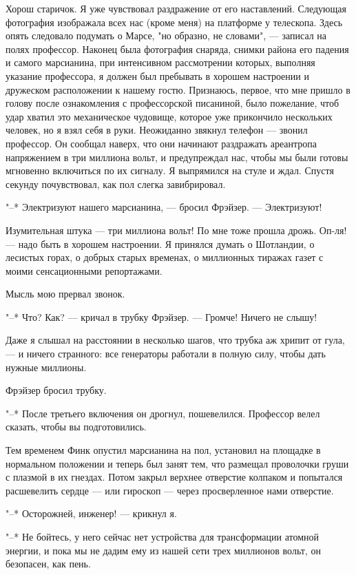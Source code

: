 Хорош старичок.  Я  уже  чувствовал  раздражение  от  его  наставлений.
Следующая фотография изображала всех  нас  (кроме  меня)  на  платформе  у
телескопа. Здесь  опять  следовало  подумать  о  Марсе,  "но  образно,  не
словами", --- записал на полях профессор. Наконец была  фотография  снаряда,
снимки  района  его  падения  и   самого   марсианина,   при   интенсивном
рассмотрении которых, выполняя указание профессора, я должен был пребывать
в хорошем настроении и дружеском расположении к нашему  гостю.  Признаюсь,
первое, что  мне  пришло  в  голову  после  ознакомления  с  профессорской
писаниной, было пожелание, чтоб удар  хватил  это  механическое  чудовище,
которое уже  прикончило  нескольких  человек,  но  я  взял  себя  в  руки.
Неожиданно звякнул телефон --- звонил профессор. Он сообщал наверх, что  они
начинают  раздражать  ареантропа  напряжением  в  три  миллиона  вольт,  и
предупреждал нас, чтобы мы были готовы мгновенно включиться по их сигналу.
Я выпрямился на стуле и ждал. Спустя секунду почувствовал, как пол  слегка
завибрировал.

"--* Электризуют нашего марсианина, --- бросил Фрэйзер. --- Электризуют!

Изумительная штука --- три миллиона вольт!  По  мне  тоже  прошла  дрожь.
Оп-ля! --- надо быть в хорошем настроении. Я принялся думать о Шотландии,  о
лесистых горах, о добрых старых временах, о  миллионных  тиражах  газет  с
моими сенсационными репортажами.

Мысль мою прервал звонок.

"--* Что? Как? --- кричал в трубку Фрэйзер. --- Громче! Ничего не слышу!

Даже я слышал на расстоянии в несколько шагов, что трубка аж хрипит  от
гула, --- и ничего странного: все генераторы работали в полную  силу,  чтобы
дать нужные миллионы.

Фрэйзер бросил трубку.

"--* После третьего включения он  дрогнул,  пошевелился.  Профессор  велел
сказать, чтобы вы подготовились.

Тем временем Финк опустил марсианина на пол, установил  на  площадке  в
нормальном положении и теперь был занят тем, что размещал проволочки груши
с плазмой  в  их  гнездах.  Потом  закрыл  верхнее  отверстие  колпаком  и
попытался расшевелить сердце --- или гироскоп  ---  через  просверленное  нами
отверстие.

"--* Осторожней, инженер! --- крикнул я.

"--* Не бойтесь, у него сейчас нет устройства  для  трансформации  атомной
энергии, и пока мы не дадим ему из нашей сети  трех  миллионов  вольт,  он
безопасен, как пень.

